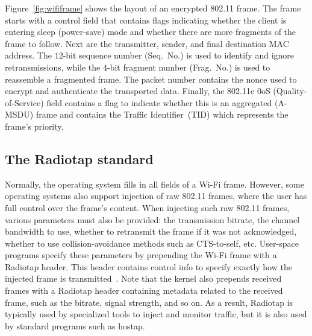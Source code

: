 \documentclass[sigconf]{acmart}
\newcommand{\wifi}{\mbox{Wi-Fi}}
\begin{document}
Figure~\ref{fig:wififrame} shows the layout of an encrypted 802.11 frame.
The frame starts with a control field that contains flags indicating
whether the client is entering sleep (power-save) mode and whether there are more fragments of the frame to follow.
Next are the transmitter, sender, and final destination MAC address.
The $12$-bit sequence number (Seq.~No.) is used to identify and ignore retransmissions, while the $4$-bit fragment number (Frag.~No.) is used to reassemble a fragmented frame.
The packet number contains the nonce used to encrypt and authenticate the transported data.
Finally, the 802.11e 0oS (Quality-of-Service) field contains a flag to indicate whether this is an aggregated (A-MSDU) frame and contains the Traffic Identifier~(TID) which represents the frame's priority.

\subsection{The Radiotap standard}
\label{sec:back:radiotap}

Normally, the operating system fills in all fields of a \wifi{} frame.
However, some operating systems also support injection of raw 802.11 frames, where the user has full control over the frame's content.
When injecting such raw 802.11 frames, various parameters must also be provided: the transmission bitrate, the channel bandwidth to use, whether to retransmit the frame if it was not acknowledged, whether to use collision-avoidance methods such as CTS-to-self, etc.
User-space programs specify these parameters by prepending the \wifi{} frame with a Radiotap header.
This header contains control info to specify exactly how the injected frame is transmitted~\cite{radiotap}.
Note that the kernel also prepends received frames with a Radiotap header containing metadata related to the received frame, such as the bitrate, signal strength, and so on.
As a result, Radiotap is typically used by specialized tools to inject and monitor traffic, but it is also used by standard programs such as hostap.
\end{document}
